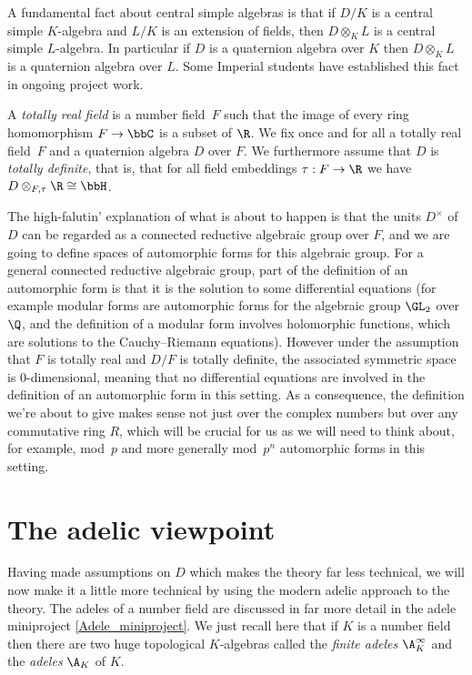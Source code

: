 A fundamental fact about central simple algebras is that if $D/K$
is a central simple $K$-algebra and $L/K$ is an extension of fields, then $D\otimes_KL$
is a central simple $L$-algebra. In particular if $D$ is a quaternion algebra over $K$
then $D\otimes_KL$ is a quaternion algebra over $L$. Some Imperial students have established
this fact in ongoing project work.

A \emph{totally real field} is a number field~$F$ such that the image of every ring
homomorphism $F\to\bbC$ is a subset of $\R$. We fix once and for all a totally real field~$F$ and a
quaternion algebra $D$ over $F$. We furthermore assume that $D$ is \emph{totally definite}, that is,
that for all field embeddings $\tau:F\to\R$ we have $D\otimes_{F,\tau}\R\cong\bbH$.

The high-falutin' explanation of what is about to happen is that the units $D^\times$ of $D$
can be regarded as a connected reductive algebraic group over $F$, and we are going to define spaces
of automorphic forms for this algebraic group. For a general connected reductive algebraic group,
part of the definition of an automorphic form is that it is the solution to some differential
equations (for example modular forms are automorphic forms for the algebraic group $\GL_2$ over
$\Q$, and the definition of a modular form involves holomorphic functions, which are solutions to
the Cauchy--Riemann equations). However under the assumption that $F$ is totally real and $D/F$ is
totally definite, the associated symmetric space is 0-dimensional, meaning that no differential
equations are involved in the definition
of an automorphic form in this setting. As a consequence, the definition we're about to give
makes sense not just over the complex numbers but over any commutative ring $R$, which will
be crucial for us as we will need to think about, for example, mod~$p$ and more generally
mod~$p^n$ automorphic forms in this setting.

\section{The adelic viewpoint}

Having made assumptions on $D$ which makes the theory far less technical, we will now
make it a little more technical by using the modern adelic approach to the theory.
The adeles of a number field are discussed in far more detail
in the adele miniproject \ref{Adele_miniproject}. We just recall here that if $K$ is a number field
then there are two huge topological $K$-algebras called the \emph{finite adeles}
$\A_K^\infty$ and the \emph{adeles} $\A_K$ of $K$.

